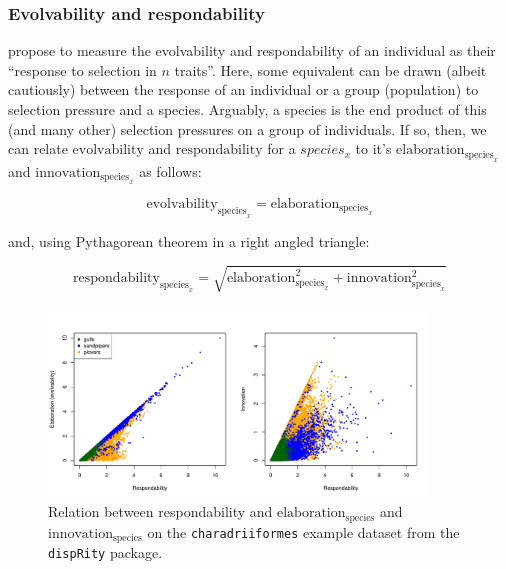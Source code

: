 \documentclass[12pt,a4paper]{article}
\begin{document}
\subsubsection{Evolvability and respondability}

\cite{hansen2008measuring} propose to measure the evolvability and respondability of an individual as their ``response to selection in $n$ traits''.
Here, some equivalent can be drawn (albeit cautiously) between the response of an individual or a group (population) to selection pressure and a species.
Arguably, a species is the end product of this (and many other) selection pressures on a group of individuals.
If so, then, we can relate $\text{evolvability}$ and $\text{respondability}$ \cite{hansen2008measuring} for a $species_{x}$ to it's $\text{elaboration}_{\text{species}_{x}}$ and $\text{innovation}_{\text{species}_{x}}$ as follows:

\begin{equation}
\text{evolvability}_{\text{species}_{x}} = \text{elaboration}_{\text{species}_{x}}
\end{equation}

\noindent and, using Pythagorean theorem in a right angled triangle:

\begin{equation}
\text{respondability}_{\text{species}_{x}}  = \sqrt{\text{elaboration}_{\text{species}_{x}}^2 + \text{innovation}_{\text{species}_{x}}^2}
\end{equation}


\begin{figure}[H]
\centering
   \includegraphics[width=0.9\textwidth]{Figures/respondability.pdf}
\caption{Relation between respondability \cite{hansen2008measuring} and $\text{elaboration}_{\text{species}}$ and $\text{innovation}_{\text{species}}$ on the \texttt{charadriiformes} example dataset from the \texttt{dispRity} package.}
\label{Fig:respondability}
\end{figure}
\end{document}
